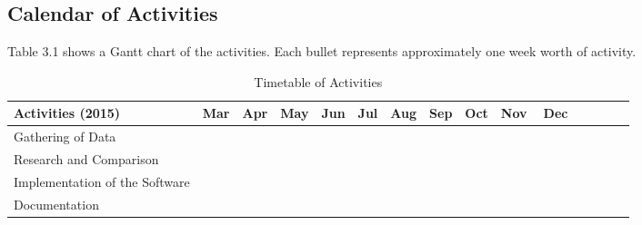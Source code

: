 \pagebreak
\begin{landscape}
\subsection{Calendar of Activities}


Table 3.1 shows a Gantt chart of the activities. Each bullet represents approximately one week worth of activity.

%
%
\newcommand{\weekone}{\textbullet}
\newcommand{\weektwo}{\textbullet \textbullet}
\newcommand{\weekthree}{\textbullet \textbullet \textbullet}
\newcommand{\weekfour}{\textbullet \textbullet \textbullet \textbullet}

%
%
\begin{comment}
   \newcommand{\weekone}{$\star$}
   \newcommand{\weektwo}{$\star \star$}
   \newcommand{\weekthree}{$\star \star \star$}
   \newcommand{\weekfour}{$\star \star \star \star$ }
\end{comment}



\begin{table}[ht]   %
\centering
\caption{Timetable of Activities} \vspace{0.25em}
\begin{tabular}{|p{2in}|c|c|c|c|c|c|c|c|c|c|c|c|c|c|} \hline
\centering Activities (2015)				& Mar		&Apr		& May		& Jun		& Jul		& Aug		& Sep		& Oct		& Nov		& Dec			\\ \hline
Gathering of Data							& \weekfour &\weektwo~~~&~\weekthree&			& \weekone	&			&			&			&			&				\\ \hline
Research and Comparison						& \weekfour &\weektwo~~~&~\weekthree&			&			&			&			&			&			&				\\ \hline
Implementation of the Software				&			&			&			& 			& 			& \weekfour & \weekfour & \weekfour	& \weekfour	&\weekone~~~~~	\\ \hline
Documentation								& \weekfour &\weektwo~~~&~\weekthree& 			&			&			& \weekfour & \weekfour	& \weekfour	&\weekone~~~~~	\\ \hline
\end{tabular}
\label{tab:timetableactivities2015}
\end{table}


\end{landscape}
